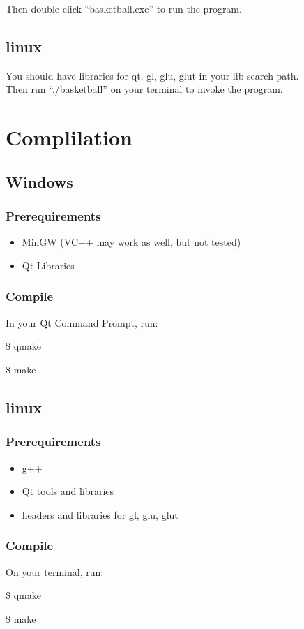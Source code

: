 \documentclass[10pt,a4paper]{article}
\begin{document}
Then double click ``basketball.exe'' to run the program.

\subsection{linux}
You should have libraries for qt, gl, glu, glut in your lib search path.\\

Then run ``./basketball'' on your terminal to invoke the program.

\section{Complilation}
\subsection{Windows}
\subsubsection{Prerequirements}
\begin{itemize}
\item MinGW (VC++ may work as well, but not tested)
\item Qt Libraries
\end{itemize}
\subsubsection{Compile}
In your Qt Command Prompt, run:

\$ qmake

\$ make

\subsection{linux}
\subsubsection{Prerequirements}
\begin{itemize}
\item g++
\item Qt tools and libraries
\item headers and libraries for gl, glu, glut
\end{itemize}
\subsubsection{Compile}
On your terminal, run:

\$ qmake

\$ make
\end{document}
